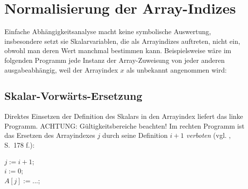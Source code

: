 \setcounter{section}{7}
\section{Normalisierung der Array-Indizes}

Einfache Abhängigkeitsanalyse macht keine symbolische Auswertung,
insbesondere setzt sie Skalarvariablen, die als Arrayindizes auftreten,
nicht ein, obwohl man deren Wert manchmal bestimmen kann. Beispielsweise
wäre im folgenden Programm jede Instanz der Array-Zuweisung von jeder
anderen ausgabeabhängig, weil der Arrayindex $x$ als unbekannt
angenommen wird:


\begin{procedure}
\SetLine
{}
\end{procedure}

\subsection{Skalar-Vorwärts-Ersetzung}
\label{sec:sve}

Direktes Einsetzen der Definition des Skalars in den Arrayindex liefert
das linke Programm. ACHTUNG: Gültigkeitsbereiche beachten! Im rechten
Programm ist das Ersetzen des Arrayindexes $j$ durch seine Definition
$i+1$ \emph{verboten} (vgl. \cite{Zima90}, S.~178 f.):\\[1cm]
\begin{minipage}{.4\textwidth}
    \begin{algorithm}[H]
    \end{algorithm}    
\end{minipage}
\begin{minipage}{.4\textwidth}
    \begin{algorithm}[H]
    $j := i+1$;\\
    $i := 0$;\\
    $A[j] := ...$;\\
    \end{algorithm}    
\end{minipage}

